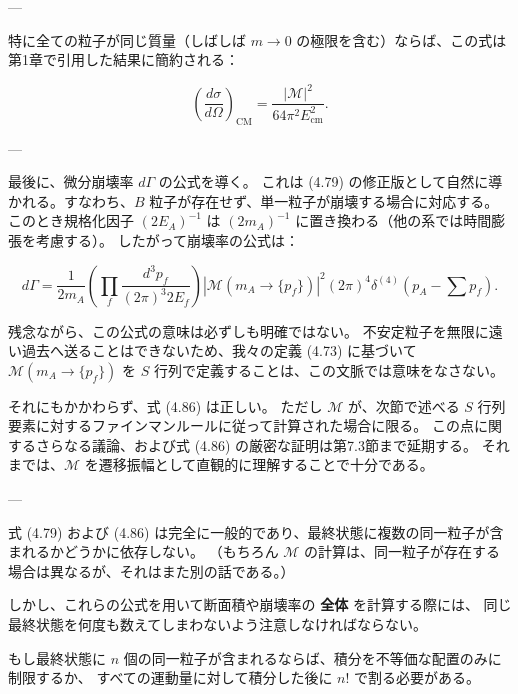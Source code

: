 \documentclass[a4paper,12pt]{article}
\begin{document}
---

特に全ての粒子が同じ質量（しばしば $m \to 0$ の極限を含む）ならば、この式は第1章で引用した結果に簡約される：

\begin{equation}
\left(\frac{d\sigma}{d\Omega}\right)_{\text{CM}}
= \frac{|\mathcal{M}|^2}{64\pi^2 E_{\text{cm}}^2}.
\tag{4.85}
\end{equation}

---

最後に、微分崩壊率 $d\Gamma$ の公式を導く。  
これは (4.79) の修正版として自然に導かれる。すなわち、$B$ 粒子が存在せず、単一粒子が崩壊する場合に対応する。  
このとき規格化因子 $(2E_A)^{-1}$ は $(2m_A)^{-1}$ に置き換わる（他の系では時間膨張を考慮する）。  
したがって崩壊率の公式は：

\begin{equation}
d\Gamma = \frac{1}{2m_A} \left( \prod_f \frac{d^3p_f}{(2\pi)^3 2E_f} \right)
|\mathcal{M}(m_A \to \{p_f\})|^2 (2\pi)^4 \delta^{(4)}(p_A - \sum p_f).
\tag{4.86}
\end{equation}

残念ながら、この公式の意味は必ずしも明確ではない。  
不安定粒子を無限に遠い過去へ送ることはできないため、我々の定義 (4.73) に基づいて  
$\mathcal{M}(m_A \to \{p_f\})$ を $S$ 行列で定義することは、この文脈では意味をなさない。  

それにもかかわらず、式 (4.86) は正しい。  
ただし $\mathcal{M}$ が、次節で述べる $S$ 行列要素に対するファインマンルールに従って計算された場合に限る。  
この点に関するさらなる議論、および式 (4.86) の厳密な証明は第7.3節まで延期する。  
それまでは、$\mathcal{M}$ を遷移振幅として直観的に理解することで十分である。  

---

式 (4.79) および (4.86) は完全に一般的であり、最終状態に複数の同一粒子が含まれるかどうかに依存しない。  
（もちろん $\mathcal{M}$ の計算は、同一粒子が存在する場合は異なるが、それはまた別の話である。）  

しかし、これらの公式を用いて断面積や崩壊率の \textbf{全体} を計算する際には、  
同じ最終状態を何度も数えてしまわないよう注意しなければならない。  

もし最終状態に $n$ 個の同一粒子が含まれるならば、積分を不等価な配置のみに制限するか、  
すべての運動量に対して積分した後に $n!$ で割る必要がある。
\end{document}
